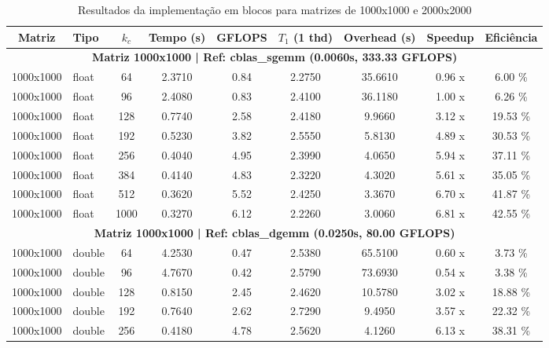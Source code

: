 \documentclass[12pt]{article}
\begin{document}
\small
\setlength{\tabcolsep}{3.5pt}
\begin{table}[H]
    \centering
    \caption{Resultados da implementação em blocos para matrizes de 1000x1000 e 2000x2000}
    \label{tab:Blocos1000_4000}
    \small
    \setlength{\tabcolsep}{3.5pt}
    \begin{tabular}{|c|l|c|c|c|c|c|c|c|}
        \hline
        \textbf{Matriz} & \textbf{Tipo} & \textbf{$k_c$} & \textbf{Tempo (s)} & \textbf{GFLOPS} & \textbf{$T_1$ (1 thd)} & \textbf{Overhead (s)} & \textbf{Speedup} & \textbf{Eficiência} \\ \hline
        \multicolumn{9}{|c|}{\textbf{Matriz 1000x1000 | Ref: cblas\_sgemm (0.0060s, 333.33 GFLOPS)}} \\ \hline
        1000x1000 & float & 64   & 2.3710 & 0.84 & 2.2750 & 35.6610 & 0.96 x & 6.00 \% \\ \hline
        1000x1000 & float & 96   & 2.4080 & 0.83 & 2.4100 & 36.1180 & 1.00 x & 6.26 \% \\ \hline
        1000x1000 & float & 128  & 0.7740 & 2.58 & 2.4180 & 9.9660  & 3.12 x & 19.53 \% \\ \hline
        1000x1000 & float & 192  & 0.5230 & 3.82 & 2.5550 & 5.8130  & 4.89 x & 30.53 \% \\ \hline
        1000x1000 & float & 256  & 0.4040 & 4.95 & 2.3990 & 4.0650  & 5.94 x & 37.11 \% \\ \hline
        1000x1000 & float & 384  & 0.4140 & 4.83 & 2.3220 & 4.3020  & 5.61 x & 35.05 \% \\ \hline
        1000x1000 & float & 512  & 0.3620 & 5.52 & 2.4250 & 3.3670  & 6.70 x & 41.87 \% \\ \hline
        1000x1000 & float & 1000 & 0.3270 & 6.12 & 2.2260 & 3.0060  & 6.81 x & 42.55 \% \\ \hline
        \multicolumn{9}{|c|}{\textbf{Matriz 1000x1000 | Ref: cblas\_dgemm (0.0250s, 80.00 GFLOPS)}} \\ \hline
        1000x1000 & double & 64   & 4.2530 & 0.47 & 2.5380 & 65.5100 & 0.60 x & 3.73 \% \\ \hline
        1000x1000 & double & 96   & 4.7670 & 0.42 & 2.5790 & 73.6930 & 0.54 x & 3.38 \% \\ \hline
        1000x1000 & double & 128  & 0.8150 & 2.45 & 2.4620 & 10.5780 & 3.02 x & 18.88 \% \\ \hline
        1000x1000 & double & 192  & 0.7640 & 2.62 & 2.7290 & 9.4950  & 3.57 x & 22.32 \% \\ \hline
        1000x1000 & double & 256  & 0.4180 & 4.78 & 2.5620 & 4.1260  & 6.13 x & 38.31 \% \\ \hline

\end{tabular}
\end{table}
\end{document}
